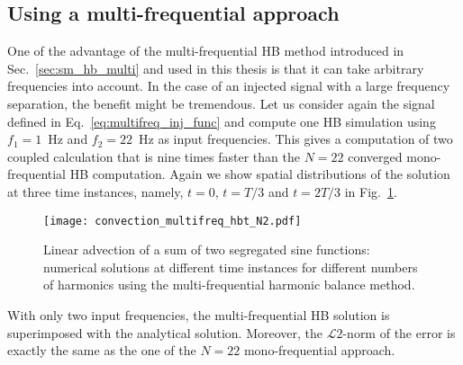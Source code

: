 \subsection{Using a multi-frequential approach}

One of the advantage of the multi-frequential HB method introduced in Sec.~\ref{sec:sm_hb_multi}
and used in this thesis is that it can take arbitrary frequencies into account.
In the case of an injected signal with a large frequency separation, the
benefit might be tremendous. Let us consider again the signal defined in 
Eq.~\eqref{eq:multifreq_inj_func} and compute one HB simulation using 
$f_1=1$~Hz and $f_2=22$~Hz as input frequencies. This gives a computation
of two coupled calculation
that is nine times faster than the $N=22$ converged mono-frequential
HB computation.
Again
we show spatial distributions of the solution
at three time instances, namely, $t=0$, $t=T/3$ and $t=2T/3$
in Fig.~\ref{fig:inj_multifreq_hb}.
\begin{figure}[htb]
  \centering
  \texttt{[image: convection\_multifreq\_hbt\_N2.pdf]}
  \caption{Linear advection of a sum of two segregated sine functions: 
  numerical solutions at different time instances for different numbers of harmonics using the
  multi-frequential harmonic balance method.}
  \label{fig:inj_multifreq_hb}
\end{figure}
With only two input frequencies, the multi-frequential
HB solution is superimposed with the analytical solution.
Moreover, the $\mathcal{L}2$-norm of the error is 
exactly the same as the one of the $N=22$ mono-frequential
approach.
